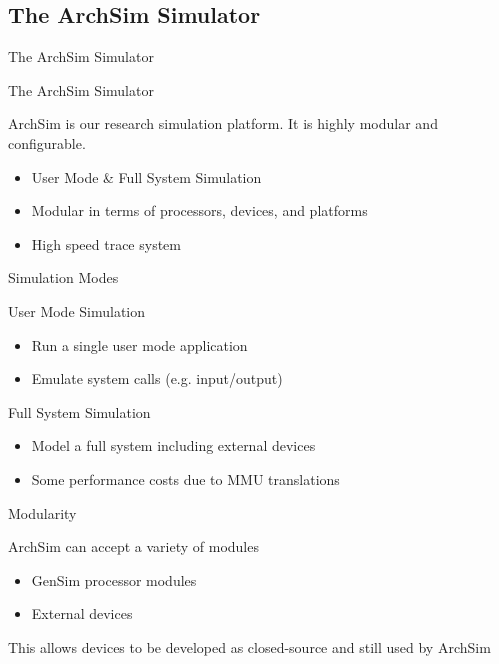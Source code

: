 \subsection{The ArchSim Simulator}

\begin{frame}{The ArchSim Simulator}

\end{frame}

\begin{frame}{The ArchSim Simulator}

ArchSim is our research simulation platform. It is highly modular and configurable.

\begin{itemize}
	\item User Mode \& Full System Simulation
	\item Modular in terms of processors, devices, and platforms
	\item High speed trace system
\end{itemize}

\end{frame}

\begin{frame}{Simulation Modes}

User Mode Simulation
\begin{itemize}
	\item Run a single user mode application
	\item Emulate system calls (e.g. input/output)
\end{itemize}

\bigskip

Full System Simulation
\begin{itemize}
	\item Model a full system including external devices
	\item Some performance costs due to MMU translations
\end{itemize}

\end{frame}

\begin{frame}{Modularity}

ArchSim can accept a variety of modules
\begin{itemize}
	\item GenSim processor modules
	\item External devices
\end{itemize}

This allows devices to be developed as closed-source and still used
by ArchSim


\end{frame}

